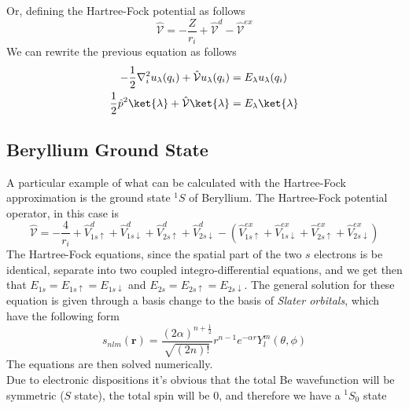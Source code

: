 \documentclass[a4paper, 11pt]{book}
\renewcommand{\vec}[1]{\mathbf{#1}}
\newcommand{\1}{\opr{\mathds{1}}}
\newcommand{\opr}[1]{\hat{#1}}
\newcommand{\up}{\uparrow}
\newcommand{\down}{\downarrow}
\theoremstyle{plain}
\begin{document}
	Or, defining the Hartree-Fock potential as follows
	\begin{equation}
		\opr{\mathcal{V}}=-\frac{Z}{r_i}+\opr{\mathcal{V}}^d-\opr{\mathcal{V}}^{ex}
		\label{eq:hfpotential}
	\end{equation}
	We can rewrite the previous equation as follows
	\begin{equation}
		\begin{aligned}
			-\frac{1}{2}\nabla_i^2u_{\lambda}(q_i)+\opr{\mathcal{V}}u_{\lambda}(q_i)&=E_{\lambda}u_{\lambda}(q_i)\\
			\frac{1}{2}\opr{p}^2\ket{\lambda}+\opr{\mathcal{V}}\ket{\lambda}&=E_{\lambda}\ket{\lambda}
		\end{aligned}
		\label{eq:hartreefockequationpotentialhf}
	\end{equation}
	\subsection{Beryllium Ground State}
	A particular example of what can be calculated with the Hartree-Fock approximation is the ground state $^1S$ of Beryllium. The Hartree-Fock potential operator, in this case is
	\begin{equation}
		\opr{\mathcal{V}}=-\frac{4}{r_i}+\opr{V}^d_{1s\up}+\opr{V}^d_{1s\down}+\opr{V}^d_{2s\up}+\opr{V}^d_{2s\down}-\left( \opr{V}^{ex}_{1s\up}+\opr{V}^{ex}_{1s\down}+\opr{V}^{ex}_{2s\up}+\opr{V}^{ex}_{2s\down} \right)
		\label{eq:BeHFop}
	\end{equation}
	The Hartree-Fock equations, since the spatial part of the two $s$ electrons is be identical, separate into two coupled integro-differential equations, and we get then that $E_{1s}=E_{1s\up}=E_{1s\down}$ and $E_{2s}=E_{2s\up}=E_{2s\down}$. The general solution for these equation is given through a basis change to the basis of \textit{Slater orbitals}, which have the following form
	\begin{equation}
		s_{nlm}(\vec{r})=\frac{(2\alpha)^{n+\frac{1}{2}}}{\sqrt{(2n)!}}r^{n-1}e^{-\alpha r}Y_{l}^m(\theta,\phi)
		\label{eq:slaterorbitals}
	\end{equation}
	The equations are then solved numerically.\\
	Due to electronic dispositions it's obvious that the total Be wavefunction will be symmetric ($S$ state), the total spin will be $0$, and therefore we have a $^1S_0$ state
\end{document}
